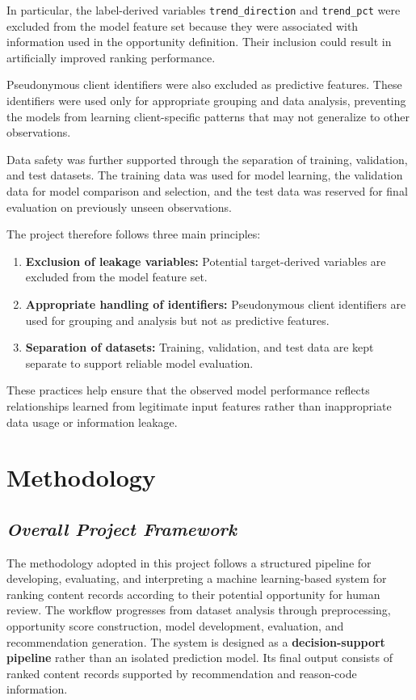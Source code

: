 \documentclass[12pt,a4paper]{report}
\begin{document}
In particular, the label-derived variables \texttt{trend\_direction} and \texttt{trend\_pct} were excluded from the model feature set because they were associated with information used in the opportunity definition. Their inclusion could result in artificially improved ranking performance.

Pseudonymous client identifiers were also excluded as predictive features. These identifiers were used only for appropriate grouping and data analysis, preventing the models from learning client-specific patterns that may not generalize to other observations.

Data safety was further supported through the separation of training, validation, and test datasets. The training data was used for model learning, the validation data for model comparison and selection, and the test data was reserved for final evaluation on previously unseen observations.

The project therefore follows three main principles:

\begin{enumerate}[leftmargin=*]
    \item \textbf{Exclusion of leakage variables:} Potential target-derived variables are excluded from the model feature set.
    \item \textbf{Appropriate handling of identifiers:} Pseudonymous client identifiers are used for grouping and analysis but not as predictive features.
    \item \textbf{Separation of datasets:} Training, validation, and test data are kept separate to support reliable model evaluation.
\end{enumerate}

These practices help ensure that the observed model performance reflects relationships learned from legitimate input features rather than inappropriate data usage or information leakage.

\chapter{Methodology}

\section{\textit{Overall Project Framework}}
The methodology adopted in this project follows a structured pipeline for developing, evaluating, and interpreting a machine learning-based system for ranking content records according to their potential opportunity for human review. The workflow progresses from dataset analysis through preprocessing, opportunity score construction, model development, evaluation, and recommendation generation. The system is designed as a \textbf{decision-support pipeline} rather than an isolated prediction model. Its final output consists of ranked content records supported by recommendation and reason-code information.
\end{document}
